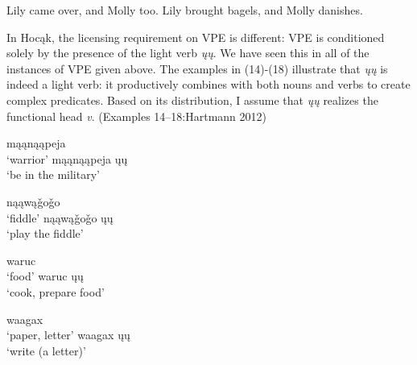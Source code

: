 \documentclass[output=paper]{LSP/langsci}
\begin{document}
\begin{exe}
\ex
\begin{xlist}
\ex
Lily came over, and Molly too.
\ex
Lily brought bagels, and Molly danishes.
\end{xlist}
\end{exe}

In Hocąk, the licensing requirement on VPE is different: VPE is conditioned solely by the presence of the light verb \emph{ųų}. We have seen this in all of the instances of VPE given above. The examples in (14)-(18) illustrate that \emph{ųų} is indeed a light verb: it productively combines with both nouns and verbs to create complex predicates. Based on its distribution, I assume that \emph{ųų} realizes the functional head \emph{v}. (Examples 14--18:Hartmann 2012)

\begin{exe}
\ex
\begin{multicols}{2}
\begin{xlist}
\ex
mąąnąąpeja\\
`warrior'
\ex
mąąnąąpeja ųų\\
`be in the military'
\end{xlist}
\end{multicols}
\end{exe}

\begin{exe}
\ex
\begin{multicols}{2}
\begin{xlist}
\ex
nąąwą\v{g}o\v{g}o\\
`fiddle'
\ex
nąąwą\v{g}o\v{g}o ųų\\
`play the fiddle'
\end{xlist}
\end{multicols}
\end{exe}

\begin{exe}
\ex
\begin{multicols}{2}
\begin{xlist}
\ex
waruc\\
`food'
\ex
waruc ųų\\
`cook, prepare food'
\end{xlist}
\end{multicols}
\end{exe}

\begin{exe}
\ex
\begin{multicols}{2}
\begin{xlist}
\ex
waagax\\
`paper, letter'
\ex
waagax ųų\\
`write (a letter)'
\end{xlist}
\end{multicols}
\end{exe}
\end{document}
